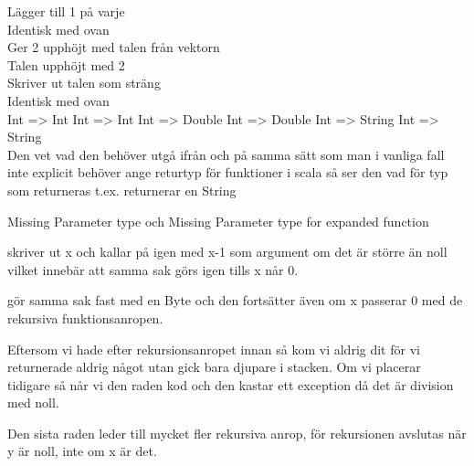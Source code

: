\Task

\Subtask
{} Lägger till 1 på varje\\
 Identisk med ovan\\
 Ger 2 upphöjt med talen från vektorn\\
 Talen upphöjt med 2\\
 Skriver ut talen som sträng\\
 Identisk med ovan\\

\Subtask
Int => Int 
Int => Int
Int => Double
Int => Double
Int => String
Int => String \\
Den vet vad den behöver utgå ifrån och på samma sätt som man i vanliga fall inte explicit behöver ange returtyp för funktioner i scala så ser den vad för typ som returneras t.ex.  returnerar en String

\Subtask
Missing Parameter type och Missing Parameter type for expanded function

\Task

\Subtask
{} skriver ut x och kallar på  igen med x-1 som argument om det är större än noll vilket innebär att samma sak görs igen tills x når 0.

 gör samma sak fast med en Byte och den fortsätter även om x passerar 0 med de rekursiva funktionsanropen.

\Subtask
Eftersom vi hade  efter rekursionsanropet innan så kom vi aldrig dit för vi returnerade aldrig något utan gick bara djupare i stacken. Om vi placerar  tidigare så når vi den raden kod och den kastar ett exception då det är division med noll.

\Subtask
Den sista raden leder till mycket fler rekursiva anrop, för rekursionen avslutas när y är noll, inte om x är det.






